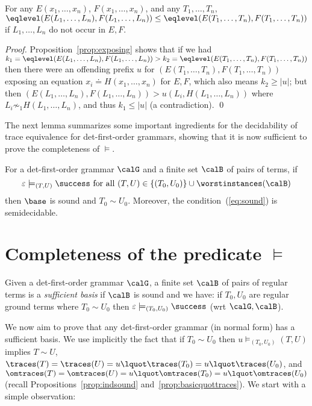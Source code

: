 \documentclass[12pt]{article}
\begin{document}
\begin{prop}\label{prop:worstinstance}
For any $E(x_1,\dots,x_n)$, $F(x_1,\dots,x_n)$, and any $T_1,\dots,T_n$,
\\
$\eqlevel(E(L_1,\dots,L_n),F(L_1,\dots,L_n))\leq 
\eqlevel(E(T_1,\dots,T_n),F(T_1,\dots,T_n))$
\\
if $L_1,\dots, L_n$
do not occur in $E,F$.
\end{prop}

\begin{proof}
Proposition~\ref{prop:exposing} shows that if we had
$k_1=\eqlevel(E(L_1,\dots,L_n),F(L_1,\dots,L_n))>
k_2= \eqlevel(E(T_1,\dots,T_n),F(T_1,\dots,T_n))$ then there were an offending prefix
$u$ for  $(E(T_1,\dots,T_n),F(T_1,\dots,T_n))$ exposing an equation
$x_i\doteq H(x_1,\dots,x_n)$ for
$E,F$, which also means $k_2\geq |u|$; but then $(E(L_1,\dots,L_n),F(L_1,\dots,L_n))
\gt{u}(L_i, H(L_1,\dots,L_n))$ where $L_i\not\sim_1 H(L_1,\dots,L_n)$,
and thus
$k_1\leq |u|$
(a contradiction).
\qed
\end{proof}


\noindent
The next lemma summarizes some important ingredients for the decidability
of trace equivalence for det-first-order grammars, showing that it
is now sufficient to
prove
the completeness of $\models$.

\begin{lemma}
For a det-first-order grammar $\calG$ and a finite set
$\calB$ of pairs of
terms, if
\begin{equation}\label{eq:sound}
\varepsilon\models_{(T,U)}\success \mbox{ for all }
(T,U)\in\{(T_0,U_0)\}\cup \worstinstances(\calB)
\end{equation}
then $\base$ is sound and $T_0\sim U_0$.
Moreover, the condition~\mbox{\textnormal{(\ref{eq:sound})}} 
is semidecidable.
\end{lemma}


\section{Completeness of the predicate $\models$}
\label{subsec:completeness}



\begin{defn}
Given a det-first-order grammar $\calG$, a finite set $\calB$ of pairs 
of regular terms is
a \emph{sufficient basis} if $\calB$ is sound and 
we have:
if $T_0,U_0$ are regular ground terms where $T_0\sim U_0$
then $\varepsilon\models_{(T_0,U_0)} \success$ (wrt $\calG,\calB$).
\end{defn}
We now aim to prove that any det-first-order grammar (in normal form)
has a sufficient basis.
We use implicitly the fact that if $T_0\sim U_0$
then $u\models_{(T_0,U_0)}(T,U)$ implies 
$T\sim U$, 
$\traces(T)=\traces(U)=u\lquot \traces(T_0) =u\lquot \traces(U_0)$,
and 
$\omtraces(T)=\omtraces(U)=u\lquot \omtraces(T_0) =u\lquot \omtraces(U_0)$
(recall Propositions~\ref{prop:indsound} and~\ref{prop:basicquottraces}).
We start with a simple observation:
\end{document}

